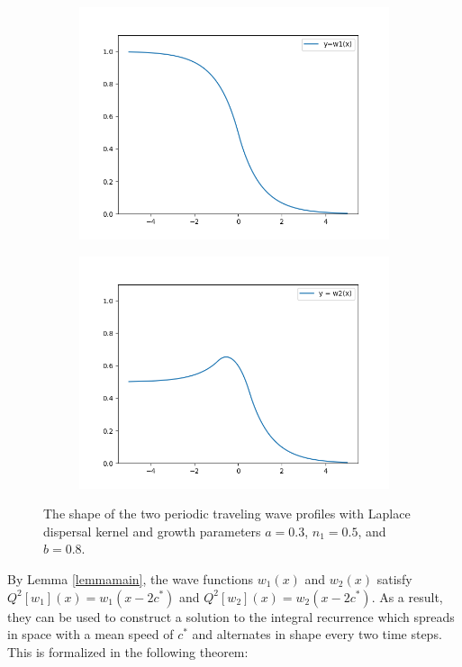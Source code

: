 \documentclass[11pt]{article}
\theoremstyle{definition}
\numberwithin{equation}{section}
\numberwithin{thm}{section}
\renewcommand{\a}{a}
\renewcommand{\b}{b}
\newcommand{\m}{n_1}
\begin{document}
\begin{figure}
\centering
\begin{subfigure}{.5\textwidth}
  \centering
  \includegraphics[width=.9\linewidth]{figures/fig2A.png}
  \label{fig:sub1}
\end{subfigure}%
\begin{subfigure}{.5\textwidth}
  \centering
  \includegraphics[width=.9\linewidth]{figures/fig2B.png}
  \label{fig:sub2}
\end{subfigure}
\caption{The shape of the two periodic traveling wave profiles with Laplace dispersal kernel and growth parameters $\a=0.3$, $\m=0.5$, and $\b=0.8$.}
\label{fig:test}
\end{figure}

By Lemma \ref{lemmamain}, the wave functions $w_1(x)$ and $w_2(x)$ satisfy $Q^2[w_1](x)=w_1(x-2c^*)$ and $Q^2[w_2](x)=w_2(x-2c^*)$. As a result, they can be used to construct a solution to the integral recurrence which spreads in space with a mean speed of $c^*$ and alternates in shape every two time steps. This is formalized in the following theorem:
\end{document}
